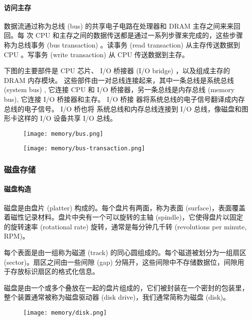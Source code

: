 \paragraph{访问主存}
数据流通过称为总线 (bus) 的共享电子电路在处理器和 DRAM 主存之间来来回回。每
次 CPU 和主存之间的数据传送都是通过一系列步骤来完成的，这些步骤称为总线事务
(bus transaction) 。读事务 (read transaction) 从主存传送数据到 CPU 。写事务 (write transaction) 从 CPU 传送数据到主存。

下图的主要部件是 CPU 芯片、 I/O
桥接器 (I/O bridge) ，以及组成主存的 DRAM 内存模块。
这些部件由一对总线连接起来，其中一条总线是系统总线 (system bus) , 它连接 CPU 和 
I/O 桥接器，另一条总线是内存总线 (memory bus), 它连接 I/O 桥接器和主存。 I/O 桥接
器将系统总线的电子信号翻译成内存总线的电子信号。 I/O 桥也将
系统总线和内存总线连接到 I/O 总线，像磁盘和图形卡这样的 I/O 设备共享 I/O 总线。

\begin{figure}[H]
    \centering
    \texttt{[image: memory/bus.png]}
\end{figure}
\begin{figure}[H]
    \centering
    \texttt{[image: memory/bus-transaction.png]}
\end{figure}

\subsubsection{磁盘存储}
\paragraph{磁盘构造}
磁盘是由盘片 (platter) 构成的。每个盘片有两面，称为表面 (surface)，表面覆盖着磁性记录材料。盘片中央有一个可以旋转的主轴 (spindle)，它使得盘片以固定的旋转速率 (rotational rate) 旋转，通常是每分钟几千转 (revolutions per minute, RPM)。

每个表面是由一组称为磁道 (track) 的同心圆组成的。每个磁道被划分为一组扇区 (sector)。扇区之间由一些间隙 (gap) 分隔开，这些间隙中不存储数据位，间隙用于存放标识扇区的格式化信息。

磁盘是由一个或多个叠放在一起的盘片组成的，它们被封装在一个密封的包装里，整个装置通常被称为磁盘驱动器 (disk drive)，我们通常简称为磁盘 (disk)。

\begin{figure}[H]
    \centering
    \texttt{[image: memory/disk.png]}
\end{figure}


